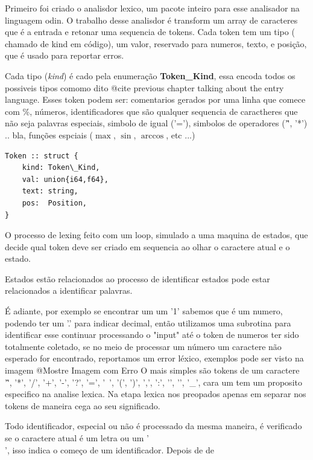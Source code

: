 Primeiro foi criado o analisdor lexico, um pacote inteiro para esse analisador na linguagem odin.
O trabalho desse analisdor é transform um array de caracteres que é a entrada e retonar uma sequencia de tokens.
Cada token tem um tipo ( chamado de kind em código), um valor, reservado para numeros, texto, e posição, que é usado para reportar erros.

Cada tipo (\textit{kind}) é cado pela enumeração \textbf{Token\_Kind}, essa encoda todos os possiveis tipos comomo dito @{cite previous chapter talking about the entry language}.
Esses token podem ser: comentarios gerados por uma linha que comece com \%, números, identificadores que são qualquer sequencia de caractheres que não seja palavras especiais, simbolo de igual ('='), simbolos de operadores ('\^', '*') .. bla, funções espciais ($\max$, $\sin$, $\arccos$, etc ...)


\begin{codigo}[H]
  \caption{\small } \label{}
\begin{lstlisting}
Token :: struct {
    kind: Token\_Kind,
    val: union{i64,f64},
    text: string,
    pos:  Position,
}

\end{lstlisting}
\end{codigo}

O processo de lexing feito com um loop, simulado a uma maquina de estados, que decide qual token deve ser criado em sequencia ao olhar o caractere atual e o estado.

Estados estão relacionados ao processo de identificar estados pode estar relacionados a identificar palavras.

É  adiante, por exemplo se encontrar um um '1' sabemos que é um numero, podendo ter um '.' para indicar decimal, então utilizamos 
uma subrotina para identificar esse continuar processando o "input" até o token de numeros ter sido totalmente coletado, se no meio de processar um número um caractere não esperado for encontrado, reportamos um error léxico, exemplos pode ser visto na imagem @{Mostre Imagem com Erro}
O mais simples são tokens de um caractere '\^', '*', '/', '+', '-', '?', '=', '~', '(', ')', ',', ':', '{', '}', '\_', cara um tem um proposito especifico na analise lexica. Na etapa lexica nos preopados apenas em separar nos tokens de maneira cega ao seu significado.


Todo identificador, especial ou não é processado da mesma maneira, é verificado se o caractere atual é um letra ou um '\\', isso indica o começo 
de um identificador. Depois de de

